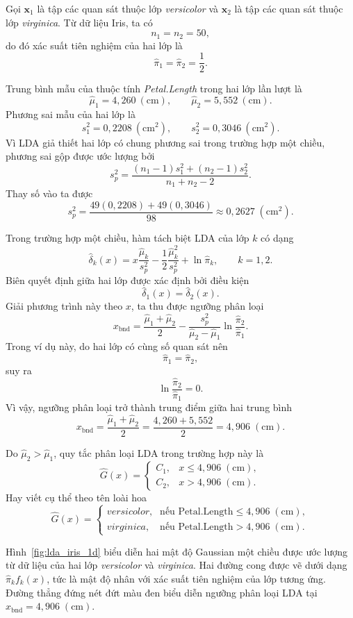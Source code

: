 Gọi $\textbf{x}_1$ là tập các quan sát thuộc lớp \textit{versicolor} và $\textbf{x}_2$ là tập các quan sát thuộc lớp \textit{virginica}. Từ dữ liệu Iris, ta có
\[
n_1=n_2=50,
\]
do đó xác suất tiên nghiệm của hai lớp là
\[
\hat\pi_1=\hat\pi_2=\frac{1}{2}.
\]

Trung bình mẫu của thuộc tính \textit{Petal.Length} trong hai lớp lần lượt là
\[
\hat{\mu}_1 = 4{,}260\ (\text{cm}), \qquad
\hat{\mu}_2 = 5{,}552\ (\text{cm}).
\]
Phương sai mẫu của hai lớp là
\[
s_1^2 = 0{,}2208\ (\text{cm}^2), \qquad
s_2^2 = 0{,}3046\ (\text{cm}^2).
\]
Vì LDA giả thiết hai lớp có chung phương sai trong trường hợp một chiều, phương sai gộp được ước lượng bởi
\[
s_p^2=
\frac{(n_1-1)s_1^2+(n_2-1)s_2^2}{n_1+n_2-2}.
\]
Thay số vào ta được
\[
s_p^2
=
\frac{49(0{,}2208)+49(0{,}3046)}{98}
\approx 0{,}2627\;(\text{cm}^2).
\]

Trong trường hợp một chiều, hàm tách biệt LDA của lớp $k$ có dạng
\[
\hat\delta_k(x)
=
x\frac{\hat\mu_k}{s_p^2}
-
\frac{1}{2}\frac{\hat\mu_k^2}{s_p^2}
+
\ln \hat\pi_k,
\qquad k=1,2.
\]
Biên quyết định giữa hai lớp được xác định bởi điều kiện
\[
\hat{\delta}_1(x)=\hat{\delta}_2(x).
\]
Giải phương trình này theo $x$, ta thu được ngưỡng phân loại
\[
x_{\text{bnd}}
=
\frac{\hat\mu_1+\hat\mu_2}{2}
-
\frac{s_p^2}{\hat\mu_2-\hat\mu_1}
\ln\frac{\hat\pi_2}{\hat\pi_1}.
\]
Trong ví dụ này, do hai lớp có cùng số quan sát nên
\[
\hat\pi_1=\hat\pi_2,
\]
suy ra
\[
\ln\frac{\hat\pi_2}{\hat\pi_1}=0.
\]
Vì vậy, ngưỡng phân loại trở thành trung điểm giữa hai trung bình
\[
x_{\text{bnd}}
=
\frac{\hat{\mu}_1+\hat{\mu}_2}{2}
=
\frac{4{,}260+5{,}552}{2}
=
4{,}906\;(\text{cm}).
\]

Do $\hat\mu_2>\hat\mu_1$, quy tắc phân loại LDA trong trường hợp này là
\[
\hat G(x)=
\begin{cases}
	C_1, & x \leq 4{,}906\;(\text{cm}),\\
	C_2, & x > 4{,}906\;(\text{cm}).
\end{cases}
\]
Hay viết cụ thể theo tên loài hoa
\[
\hat G(x)=
\begin{cases}
	\textit{versicolor}, & \text{nếu } \text{Petal.Length}\leq 4{,}906\;(\text{cm}),\\
	\textit{virginica}, & \text{nếu } \text{Petal.Length}>4{,}906\;(\text{cm}).
\end{cases}
\]

Hình~\ref{fig:lda_iris_1d} biểu diễn hai mật độ Gaussian một chiều được ước lượng từ dữ liệu của hai lớp \textit{versicolor} và \textit{virginica}. Hai đường cong được vẽ dưới dạng $\hat\pi_k f_k(x)$, tức là mật độ nhân với xác suất tiên nghiệm của lớp tương ứng. Đường thẳng đứng nét đứt màu đen biểu diễn ngưỡng phân loại LDA tại $x_{\text{bnd}}=4{,}906\;(\text{cm})$.

